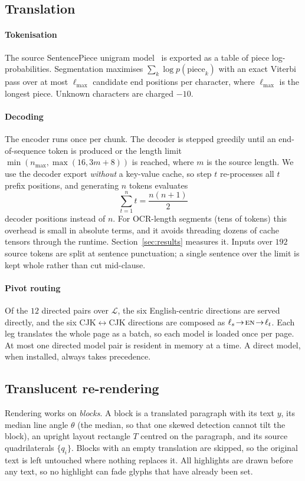 \documentclass[journal]{IEEEtran}
\theoremstyle{definition}
\begin{document}
\subsection{Translation}\label{sec:mt}
\paragraph{Tokenisation}
The source SentencePiece unigram model~\cite{kudo2018sentencepiece,kudo2018unigram}
is exported as a table of piece log-probabilities. Segmentation maximises
$\sum_k\log p(\text{piece}_k)$ with an exact Viterbi pass over at most
$\ell_{\max}$ candidate end positions per character, where $\ell_{\max}$ is the
longest piece. Unknown characters are charged $-10$.

\paragraph{Decoding}
The encoder runs once per chunk. The decoder is stepped greedily until an
end-of-sequence token is produced or the length limit
$\min(n_{\max},\max(16,3m+8))$ is reached, where $m$ is the source length. We
use the decoder export \emph{without} a key-value cache, so step $t$
re-processes all $t$ prefix positions, and generating $n$ tokens evaluates
\begin{equation}
  \textstyle\sum_{t=1}^{n}t=\frac{n(n+1)}{2}
\end{equation}
decoder positions instead of $n$. For OCR-length segments (tens of tokens)
this overhead is small in absolute terms, and it avoids threading dozens of
cache tensors through the runtime. Section~\ref{sec:results} measures it.
Inputs over $192$ source tokens are split at sentence punctuation; a single
sentence over the limit is kept whole rather than cut mid-clause.

\paragraph{Pivot routing}
Of the $12$ directed pairs over $\mathcal{L}$, the six English-centric
directions are served directly, and the six CJK$\leftrightarrow$CJK directions
are composed as $\ell_s\!\to\!\textsc{en}\!\to\!\ell_t$. Each leg translates
the whole page as a batch, so each model is loaded once per page. At most one
directed model pair is resident in memory at a time. A direct model, when
installed, always takes precedence.

\subsection{Translucent re-rendering}\label{sec:render}
Rendering works on \emph{blocks}. A block is a translated paragraph with its
text $y$, its median line angle $\theta$ (the median, so that one skewed
detection cannot tilt the block), an upright layout rectangle $T$ centred on
the paragraph, and its source quadrilaterals $\{q_i\}$. Blocks with an empty
translation are skipped, so the original text is left untouched where nothing
replaces it. All highlights are drawn before any text, so no highlight can
fade glyphs that have already been set.
\end{document}
